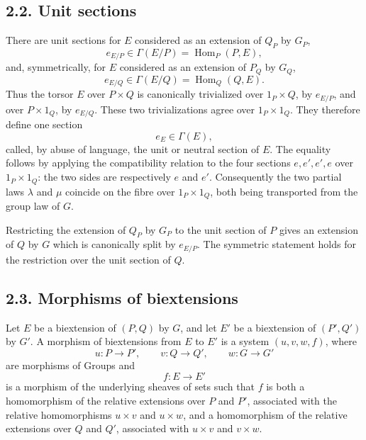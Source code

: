 \documentclass[11pt]{article}
\begin{document}
\subsection*{2.2. Unit sections}
There are unit sections for \(E\) considered as an extension of \(Q_P\) by \(G_P\),
\begin{equation}\tag{2.2.1}
  e_{E/P}\in \Gamma(E/P)=\operatorname{Hom}_P(P,E),
\end{equation}
and, symmetrically, for \(E\) considered as an extension of \(P_Q\) by \(G_Q\),
\begin{equation}\tag{2.2.2}
  e_{E/Q}\in \Gamma(E/Q)=\operatorname{Hom}_Q(Q,E).
\end{equation}
Thus the torsor \(E\) over \(P\times Q\) is canonically trivialized over \(1_P\times Q\), by \(e_{E/P}\), and over \(P\times1_Q\), by \(e_{E/Q}\).  These two trivializations agree over \(1_P\times1_Q\).  They therefore define one section
\begin{equation}\tag{2.2.3}
  e_E\in\Gamma(E),
\end{equation}
called, by abuse of language, the unit or neutral section of \(E\).  The equality follows by applying the compatibility relation to the four sections \(e,e',e',e\) over \(1_P\times1_Q\): the two sides are respectively \(e\) and \(e'\).  Consequently the two partial laws \(\lambda\) and \(\mu\) coincide on the fibre over \(1_P\times1_Q\), both being transported from the group law of \(G\).

Restricting the extension of \(Q_P\) by \(G_P\) to the unit section of \(P\) gives an extension of \(Q\) by \(G\) which is canonically split by \(e_{E/P}\).  The symmetric statement holds for the restriction over the unit section of \(Q\).

\subsection*{2.3. Morphisms of biextensions}
Let \(E\) be a biextension of \((P,Q)\) by \(G\), and let \(E'\) be a biextension of \((P',Q')\) by \(G'\).  A morphism of biextensions from \(E\) to \(E'\) is a system \((u,v,w,f)\), where
\begin{equation}\tag{2.3.1}
  u:P\to P',\qquad v:Q\to Q',\qquad w:G\to G'
\end{equation}
are morphisms of Groups and
\begin{equation}\tag{2.3.2}
  f:E\to E'
\end{equation}
is a morphism of the underlying sheaves of sets such that \(f\) is both a homomorphism of the relative extensions over \(P\) and \(P'\), associated with the relative homomorphisms \(u\times v\) and \(u\times w\), and a homomorphism of the relative extensions over \(Q\) and \(Q'\), associated with \(u\times v\) and \(v\times w\).
\end{document}
